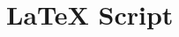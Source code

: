 \documentclass[12pt]{article}
\begin{document}

\pagebreak
\section{LaTeX Script}
\inputminted[breaklines]{tex}{main.tex}
\pagebreak
\inputminted[breaklines]{tex}{mybib.bib}




\end{document}
